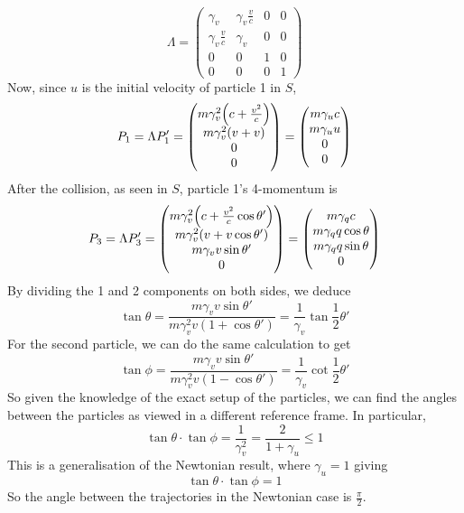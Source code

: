 \[ \Lambda = \begin{pmatrix}
		\gamma_v             & \gamma_v \frac{v}{c} & 0 & 0 \\
		\gamma_v \frac{v}{c} & \gamma_v             & 0 & 0 \\
		0                    & 0                    & 1 & 0 \\
		0                    & 0                    & 0 & 1
	\end{pmatrix} \]
Now, since \(u\) is the initial velocity of particle 1 in \(S\),
\[ P_1 = \Lambda P_1' = \begin{pmatrix}
		m\gamma_v^2 \qty(c + \frac{v^2}{c}) \\
		m\gamma_v^2 (v+v)                   \\
		0                                   \\
		0
	\end{pmatrix} = \begin{pmatrix}
		m\gamma_u c \\
		m\gamma_u u \\
		0           \\
		0
	\end{pmatrix} \]
After the collision, as seen in \(S\), particle 1's 4-momentum is
\[ P_3 = \Lambda P_3' = \begin{pmatrix}
		m\gamma_v^2 \qty(c + \frac{v^2}{c}\cos\theta') \\
		m\gamma_v^2 \qty(v + v\cos\theta')             \\
		m\gamma_v v\sin\theta'                         \\
		0
	\end{pmatrix} = \begin{pmatrix}
		m\gamma_q c           \\
		m\gamma_q q\cos\theta \\
		m\gamma_q q\sin\theta \\
		0
	\end{pmatrix} \]
By dividing the 1 and 2 components on both sides, we deduce
\[ \tan\theta = \frac{m\gamma_v v\sin\theta'}{m\gamma_v^2 v(1 + \cos\theta')} = \frac{1}{\gamma_v} \tan\frac{1}{2}\theta' \]
For the second particle, we can do the same calculation to get
\[ \tan\phi = \frac{m\gamma_v v\sin\theta'}{m\gamma_v^2 v(1 - \cos\theta')} = \frac{1}{\gamma_v} \cot\frac{1}{2}\theta' \]
So given the knowledge of the exact setup of the particles, we can find the angles between the particles as viewed in a different reference frame. In particular,
\[ \tan\theta \cdot \tan\phi = \frac{1}{\gamma_v^2} = \frac{2}{1+\gamma_u} \leq 1 \]
This is a generalisation of the Newtonian result, where \(\gamma_u = 1\) giving
\[ \tan\theta \cdot \tan\phi = 1 \]
So the angle between the trajectories in the Newtonian case is \(\frac{\pi}{2}\).

